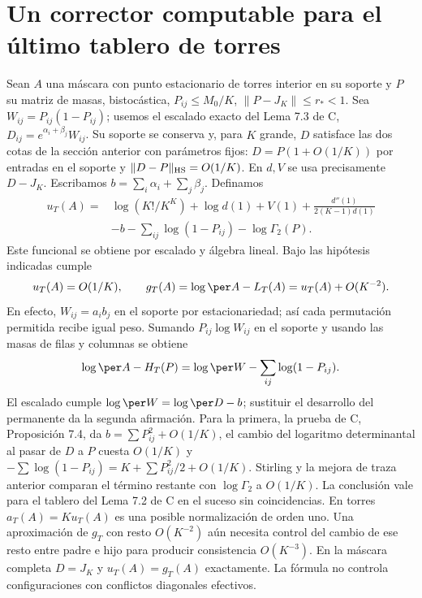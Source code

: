 \section{Un corrector computable para el último tablero de torres}
Sean $A$ una máscara con punto estacionario de torres interior en su soporte y $P$
su matriz de masas, bistocástica, $P_{ij}\le M_0/K$, $\|P-J_K\|\le r_*<1$.
Sea $W_{ij}=P_{ij}(1-P_{ij})$; usemos el escalado exacto del Lema 7.3 de C,
$D_{ij}=e^{\alpha_i+\beta_j}W_{ij}$. Su soporte se conserva y, para $K$ grande,
$D$ satisface las dos cotas de la sección anterior con parámetros fijos:
$D=P(1+O(1/K))$ por entradas en el soporte y $\|D-P\|_{\rm HS}=O(1/K)$.
En $d,V$ se usa precisamente $D-J_K$. Escribamos $b=\sum_i\alpha_i+\sum_j\beta_j$.
Definamos
\[
 \begin{split}
 u_T(A)={}&\log(K!/K^K)+\log d(1)+V(1)+\frac{d''(1)}{2(K-1)d(1)}\\
 &-b-\sum_{ij}\log(1-P_{ij})-\log\Gamma_2(P).
 \end{split}
\]
Este funcional se obtiene por escalado y álgebra lineal. Bajo las hipótesis
indicadas cumple
\[
 u_T(A)=O(1/K),\qquad g_T(A)=\log\per A-L_T(A)=u_T(A)+O(K^{-2}).
\]
En efecto, $W_{ij}=a_i b_j$ en el soporte por estacionariedad; así cada
permutación permitida recibe igual peso. Sumando $P_{ij}\log W_{ij}$ en el soporte
y usando las masas de filas y columnas se obtiene
\[
 \log\per A-H_T(P)=\log\per W-\sum_{ij}\log(1-P_{ij}).
\]
El escalado cumple $\log\per W=\log\per D-b$; sustituir el desarrollo del
permanente da la segunda afirmación. Para la primera, la prueba de C,
Proposición 7.4, da $b=\sum P_{ij}^2+O(1/K)$, el cambio del logaritmo
determinantal al pasar de $D$ a $P$ cuesta $O(1/K)$ y
$-\sum\log(1-P_{ij})=K+\sum P_{ij}^2/2+O(1/K)$. Stirling y la mejora de
traza anterior comparan el término restante con $\log\Gamma_2$ a $O(1/K)$.
La conclusión vale para el tablero del Lema 7.2 de C en el suceso sin
coincidencias. En torres $a_T(A)=K u_T(A)$ es una posible normalización de orden
uno. Una aproximación de $g_T$ con resto $O(K^{-2})$ aún necesita control
del cambio de ese resto entre padre e hijo para producir consistencia $O(K^{-3})$.
En la máscara completa $D=J_K$ y $u_T(A)=g_T(A)$ exactamente.
La fórmula no controla configuraciones con conflictos diagonales efectivos.
